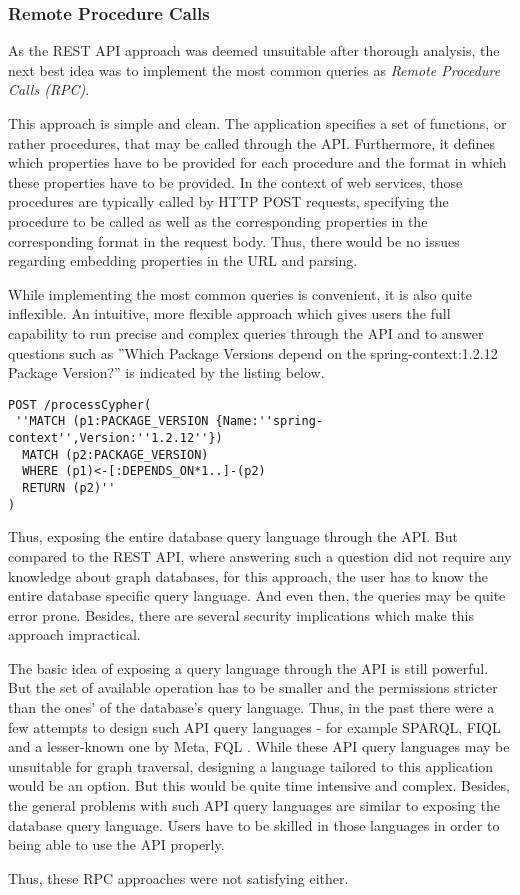 \subsubsection{Remote Procedure Calls}
As the REST API approach was deemed unsuitable after thorough analysis, the next best idea was to implement the most common queries as \emph{Remote Procedure Calls (RPC)}.\par 
This approach is simple and clean. The application specifies a set of functions, or rather procedures, that may be called through the API. Furthermore, it defines which properties have to be provided for each procedure and the format in which these properties have to be provided. In the context of web services, those procedures are typically called by HTTP POST requests, specifying the procedure to be called as well as the corresponding properties in the corresponding format in the request body. Thus, there would be no issues regarding embedding properties in the URL and parsing.\par
While implementing the most common queries is convenient, it is also quite inflexible. An intuitive, more flexible approach which gives users the full capability to run precise and complex queries through the API and to answer questions such as ''Which Package Versions depend on the spring-context:1.2.12 Package Version?'' is indicated by the listing below.

\begin{lstlisting}[caption=Exposing Cypher through API, captionpos=b, label=lst:CypherThroughAPI]
POST /processCypher(
 ''MATCH (p1:PACKAGE_VERSION {Name:''spring-context'',Version:''1.2.12''})
  MATCH (p2:PACKAGE_VERSION)
  WHERE (p1)<-[:DEPENDS_ON*1..]-(p2)
  RETURN (p2)''
)
\end{lstlisting}

Thus, exposing the entire database query language through the API. But compared to the REST API, where answering such a question did not require any knowledge about graph databases, for this approach, the user has to know the entire database specific query language. And even then, the queries may be quite error prone. Besides, there are several security implications which make this approach impractical.\par
The basic idea of exposing a query language through the API is still powerful. But the set of available operation has to be smaller and the permissions stricter than the ones' of the database's query language. Thus, in the past there were a few attempts to design such API query languages - for example SPARQL, FIQL and a lesser-known one by Meta, FQL \cite{APIYouWontHate}. While these API query languages may be unsuitable for graph traversal, designing a language tailored to this application would be an option. But this would be quite time intensive and complex. Besides, the general problems with such API query languages are similar to exposing the database query language. Users have to be skilled in those languages in order to being able to use the API properly.\par
Thus, these RPC approaches were not satisfying either.

